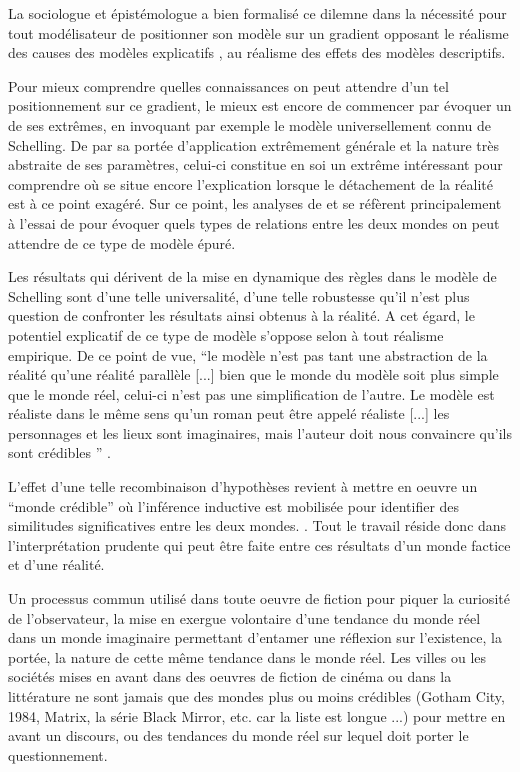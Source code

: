 La sociologue et épistémologue \textcite{Bulle2005} a bien formalisé ce dilemne dans la nécessité pour tout modélisateur de positionner son modèle sur un gradient opposant le réalisme des causes des modèles explicatifs , au réalisme des effets des modèles descriptifs.

Pour mieux comprendre quelles connaissances on peut attendre d'un tel positionnement sur ce gradient, le mieux est encore de commencer par évoquer un de ses extrêmes, en invoquant par exemple le modèle universellement connu de Schelling. De par sa portée d'application extrêmement générale et la nature très abstraite de ses paramètres, celui-ci constitue en soi un extrême intéressant pour comprendre où se situe encore l'explication lorsque le détachement de la réalité est à ce point exagéré. Sur ce point, les analyses de \textcite{Bulle2005} et \textcites{Phan2008, Phan2010} se réfèrent principalement à l'essai de \textcite{Sugden2002} pour évoquer quels types de relations entre les deux mondes on peut attendre de ce type de modèle épuré.

Les résultats qui dérivent de la mise en dynamique des règles dans le modèle de Schelling sont d'une telle universalité, d'une telle robustesse qu'il n'est plus question de confronter les résultats ainsi obtenus à la réalité. A cet égard, le potentiel explicatif de ce type de modèle s'oppose selon \textcite{Bulle2005} à tout réalisme empirique. De ce point de vue, \enquote{le modèle n'est pas tant une abstraction de la réalité qu’une réalité parallèle [...] bien que le monde du modèle soit plus simple que le monde réel, celui-ci n'est pas une simplification de l'autre. Le modèle est réaliste dans le même sens qu'un roman peut être appelé réaliste [...] les personnages et les lieux sont imaginaires, mais l'auteur doit nous convaincre qu'ils sont crédibles } \autocites[131]{Sugden2002}[10]{Phan2008}.

L'effet d'une telle recombinaison d'hypothèses revient à mettre en oeuvre un \enquote{monde crédible} où l'inférence inductive est mobilisée pour identifier des similitudes significatives entre les deux mondes. \autocites{Livet2006, Phan2008}. Tout le travail réside donc dans l'interprétation prudente qui peut être faite entre ces résultats d'un monde factice et d'une réalité.

Un processus commun utilisé dans toute oeuvre de fiction pour piquer la curiosité de l'observateur, la mise en exergue volontaire d'une tendance du monde réel dans un monde imaginaire permettant d'entamer une réflexion sur l'existence, la portée, la nature de cette même tendance dans le monde réel. Les villes ou les sociétés mises en avant dans des oeuvres de fiction de cinéma ou dans la littérature ne sont jamais que des mondes plus ou moins crédibles (Gotham City, 1984, Matrix, la série Black Mirror, etc. car la liste est longue ...)  pour mettre en avant un discours, ou des tendances du monde réel sur lequel doit porter le questionnement. %

